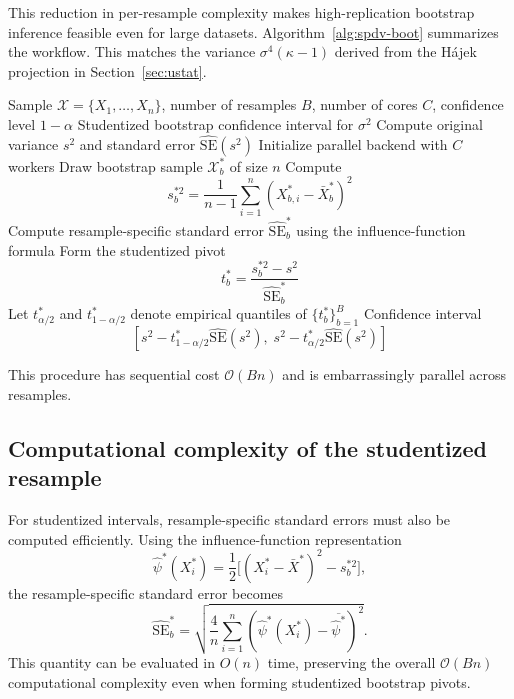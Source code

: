 \documentclass[12pt,a4paper]{article}
\begin{document}
This reduction in per-resample complexity makes high-replication bootstrap
inference feasible even for large datasets. Algorithm~\ref{alg:spdv-boot}
summarizes the workflow. This matches the variance $\sigma^4(\kappa-1)$ derived from the Hájek projection in Section~\ref{sec:ustat}.


\begin{algorithm}[H]
\caption{Studentized bootstrap for SPDV-based variance inference}
\label{alg:spdv-boot}
\begin{algorithmic}[1]
\REQUIRE Sample $\mathcal{X} = \{X_1,\dots,X_n\}$, number of resamples $B$,
number of cores $C$, confidence level $1-\alpha$
\ENSURE Studentized bootstrap confidence interval for $\sigma^2$
\STATE Compute original variance $s^2$ and standard error
$\widehat{\mathrm{SE}}(s^2)$
\STATE Initialize parallel backend with $C$ workers
    \STATE Draw bootstrap sample $\mathcal{X}_b^*$ of size $n$
    \STATE Compute
    \[
    s_b^{*2} = \frac{1}{n-1}
    \sum_{i=1}^n (X_{b,i}^*-\bar X_b^*)^2
    \]
    \STATE Compute resample-specific standard error
    $\widehat{\mathrm{SE}}_b^*$ using the influence-function formula
    \STATE Form the studentized pivot
    \[
    t_b^* =
    \frac{s_b^{*2}-s^2}{\widehat{\mathrm{SE}}_b^*}
    \]
\ENDFOR
\STATE Let $t^*_{\alpha/2}$ and $t^*_{1-\alpha/2}$ denote empirical
quantiles of $\{t_b^*\}_{b=1}^B$
\RETURN Confidence interval
\[
\left[
s^2 - t^*_{1-\alpha/2}\widehat{\mathrm{SE}}(s^2),
\;
s^2 - t^*_{\alpha/2}\widehat{\mathrm{SE}}(s^2)
\right]
\]
\end{algorithmic}
\end{algorithm}
This procedure has sequential cost $\mathcal{O}(Bn)$ and is embarrassingly parallel across resamples.
\subsection{Computational complexity of the studentized resample}

For studentized intervals, resample-specific standard errors must also be
computed efficiently. Using the influence-function representation
\[
\hat{\psi}^*(X_i^*)
=
\frac{1}{2}\big[(X_i^*-\bar X^*)^2 - s_b^{*2}\big],
\]
the resample-specific standard error becomes
\[
\widehat{\mathrm{SE}}_b^*
=
\sqrt{
\frac{4}{n}
\sum_{i=1}^n
\left(
\hat{\psi}^*(X_i^*) - \overline{\hat{\psi}^*}
\right)^2
}.
\]
This quantity can be evaluated in $O(n)$ time, preserving the overall
$\mathcal{O}(Bn)$ computational complexity even when forming
studentized bootstrap pivots.
\end{document}
